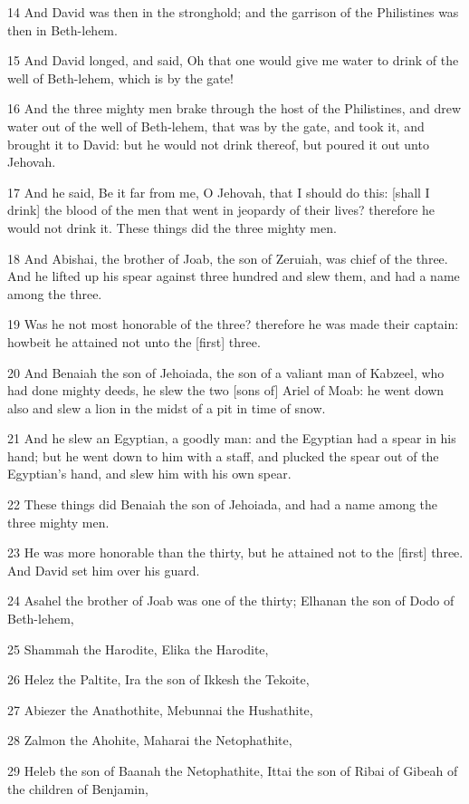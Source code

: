 \par 14 And David was then in the stronghold; and the garrison of the Philistines was then in Beth-lehem.
\par 15 And David longed, and said, Oh that one would give me water to drink of the well of Beth-lehem, which is by the gate!
\par 16 And the three mighty men brake through the host of the Philistines, and drew water out of the well of Beth-lehem, that was by the gate, and took it, and brought it to David: but he would not drink thereof, but poured it out unto Jehovah.
\par 17 And he said, Be it far from me, O Jehovah, that I should do this: [shall I drink] the blood of the men that went in jeopardy of their lives? therefore he would not drink it. These things did the three mighty men.
\par 18 And Abishai, the brother of Joab, the son of Zeruiah, was chief of the three. And he lifted up his spear against three hundred and slew them, and had a name among the three.
\par 19 Was he not most honorable of the three? therefore he was made their captain: howbeit he attained not unto the [first] three.
\par 20 And Benaiah the son of Jehoiada, the son of a valiant man of Kabzeel, who had done mighty deeds, he slew the two [sons of] Ariel of Moab: he went down also and slew a lion in the midst of a pit in time of snow.
\par 21 And he slew an Egyptian, a goodly man: and the Egyptian had a spear in his hand; but he went down to him with a staff, and plucked the spear out of the Egyptian's hand, and slew him with his own spear.
\par 22 These things did Benaiah the son of Jehoiada, and had a name among the three mighty men.
\par 23 He was more honorable than the thirty, but he attained not to the [first] three. And David set him over his guard.
\par 24 Asahel the brother of Joab was one of the thirty; Elhanan the son of Dodo of Beth-lehem,
\par 25 Shammah the Harodite, Elika the Harodite,
\par 26 Helez the Paltite, Ira the son of Ikkesh the Tekoite,
\par 27 Abiezer the Anathothite, Mebunnai the Hushathite,
\par 28 Zalmon the Ahohite, Maharai the Netophathite,
\par 29 Heleb the son of Baanah the Netophathite, Ittai the son of Ribai of Gibeah of the children of Benjamin,
